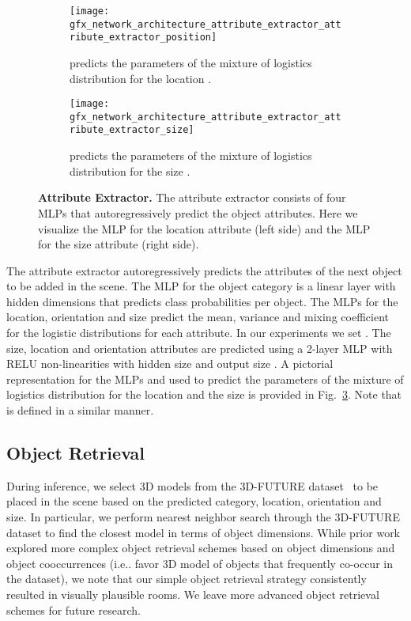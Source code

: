 \documentclass{article}
\makeatletter
\DeclareRobustCommand\onedot{\futurelet\@let@token\@onedot}
\def\@onedot{\ifx\@let@token.\else.\null\fi\xspace}
\def\ie{i.e\onedot} \def\Ie{I.e\onedot}
\newcommand{\boldparagraph}[1]{\vspace{0.2cm}\noindent{\bf #1:} }
\newcommand{\figref}[1]{Fig.~\ref{#1}}
\makeatother
\begin{document}
\begin{figure}[!h]
    \vspace{-0.8em}
    \centering
    \begin{subfigure}[t]{0.48\columnwidth}
        \centering
        \texttt{[image: gfx\_network\_architecture\_attribute\_extractor\_attribute\_extractor\_position]}
        \vspace{-1.2em}
        \caption{ predicts the parameters of the mixture of logistics distribution for the location .}
        \label{fig:mlp_translation}
    \end{subfigure}\hfill
    \begin{subfigure}[t]{0.48\columnwidth}
        \centering
        \texttt{[image: gfx\_network\_architecture\_attribute\_extractor\_attribute\_extractor\_size]}
        \vspace{-1.2em}
        \caption{ predicts the parameters of the mixture of logistics distribution for the size .}
        \label{fig:mlp_size}
    \end{subfigure}
    \caption{{\bf{Attribute Extractor.}} The attribute extractor consists of
    four MLPs that autoregressively predict the object attributes. Here we
    visualize the MLP  for the location attribute (left side)
    and the MLP  for the size attribute (right side).}
    \label{fig:attribute_extractor}
    \vspace{-0.8em}
\end{figure}

\boldparagraph{Attribute Extractor}The attribute extractor autoregressively predicts the attributes of the next
object to be added in the scene. The MLP for the object category is a linear
layer with  hidden dimensions that predicts  class probabilities per
object. The MLPs for the location, orientation and size predict the mean,
variance and mixing coefficient for the  logistic distributions for each
attribute. In our experiments we set .  The size, location and
orientation attributes are predicted using a 2-layer MLP with RELU
non-linearities with hidden size  and output size . A pictorial
representation for the MLPs  and  used to predict the
parameters of the mixture of logistics distribution for the location and the
size is provided in \figref{fig:attribute_extractor}. Note that
 is defined in a similar manner.

\subsection{Object Retrieval}
During inference, we select 3D models from the 3D-FUTURE
dataset~\cite{Fu2020ARXIVb} to be placed in the scene based on the predicted
category, location, orientation and size. In particular, we perform nearest
neighbor search through the 3D-FUTURE dataset\cite{Fu2020ARXIVb} to find the
closest model in terms of object dimensions. While prior work
\cite{Ritchie2019CVPR, Wang2020ARXIV} explored more complex object retrieval
schemes based on object dimensions and object cooccurrences (\ie favor 3D model
of objects that frequently co-occur in the dataset), we note that our simple
object retrieval strategy consistently resulted in visually
plausible rooms. We leave more advanced object retrieval schemes for future
research.
\end{document}
